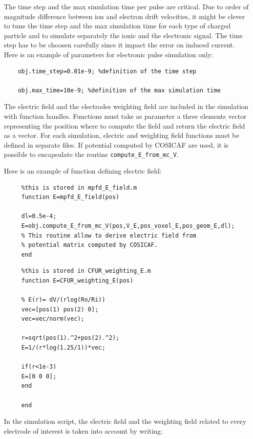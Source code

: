 \documentclass[10pt]{article}
\begin{document}
	The time step and the max simulation time per pulse are critical. Due to order of magnitude difference between ion and electron drift velocities, it might be clever to tune the time step and the max simulation time for each type of charged particle and to simulate separately the ionic and the electronic signal. The time step has to be choosen carefully since it impact the error on induced current. Here is an example of parameters for electronic pulse simulation only:
	
	\begin{lstlisting}
	obj.time_step=0.01e-9; %definition of the time step
	
	obj.max_time=10e-9; %definition of the max simulation time
	\end{lstlisting}
	
	The electric field and the electrodes weighting field are included
	 in the simulation with function handles. Functions must take as parameter a three elements vector representing the position where to compute the field and return the electric field as a vector.
	 For each simulation, electric and weighting field functions must be defined in separate files. If potential computed by COSICAF are used, it is possible to encapsulate the routine \lstinline{compute_E_from_mc_V}.
	 
	 Here is an example of function defining electric field:
	 
	 \begin{lstlisting}
	 %this is stored in mpfd_E_field.m
	 function E=mpfd_E_field(pos)
	 
	 dl=0.5e-4;
	 E=obj.compute_E_from_mc_V(pos,V_E,pos_voxel_E,pos_geom_E,dl);
	 % This routine allow to derive electric field from 
	 % potential matrix computed by COSICAF.
	 end
	 \end{lstlisting}
	 
	 \begin{lstlisting}
	 %this is stored in CFUR_weighting_E.m
	 function E=CFUR_weighting_E(pos)
	 
	 % E(r)= dV/(rlog(Ro/Ri))
	 vec=[pos(1) pos(2) 0];
	 vec=vec/norm(vec);
	
	 r=sqrt(pos(1).^2+pos(2).^2); 
	 E=1/(r*log(1.25/1))*vec;
	 
	 if(r<1e-3)
	 E=[0 0 0];
	 end
	 
	 end
	 \end{lstlisting}
	 
	 In the simulation script, the electric field and the weighting field related to every electrode of interest is taken into account by writing:
	 
\end{document}
